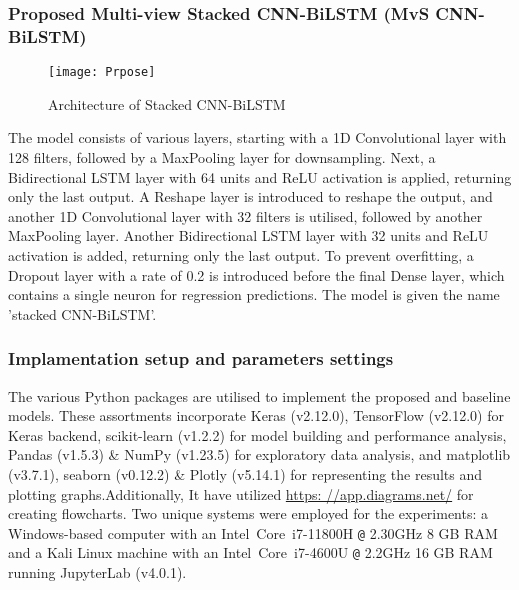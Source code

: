\begin{enumerate}[label=(\alph*)]
\end{enumerate}


\subsubsection{Proposed Multi-view Stacked CNN-BiLSTM (MvS CNN-BiLSTM)}
\begin{figure*}[h!]
	\centering
		\texttt{[image: Prpose]}
	  \caption{Architecture of Stacked CNN-BiLSTM}\label{prosed_cnn-bilstm}
\end{figure*}

The model consists of various layers,  starting with a 1D Convolutional layer with 128 filters,  followed by a MaxPooling layer for downsampling. Next,  a Bidirectional LSTM layer with 64 units and ReLU activation is applied,  returning only the last output. A Reshape layer is introduced to reshape the output, and another 1D Convolutional layer with 32 filters is utilised,  followed by another MaxPooling layer. Another Bidirectional LSTM layer with 32 units and ReLU activation is added, returning only the last output. To prevent overfitting,  a Dropout layer with a rate of 0.2 is introduced before the final Dense layer,  which contains a single neuron for regression predictions. The model is given the name 'stacked CNN-BiLSTM'.

\subsubsection{Implamentation setup and parameters settings}
The various Python packages are utilised to implement the proposed and baseline models. These assortments incorporate Keras (v2.12.0),  TensorFlow (v2.12.0) for Keras backend, scikit-learn (v1.2.2) for model building and performance analysis,  Pandas (v1.5.3) \& NumPy (v1.23.5) for exploratory data analysis,  and matplotlib (v3.7.1),  seaborn (v0.12.2) \& Plotly (v5.14.1) for representing the results and plotting graphs.Additionally,  It have utilized \href{https: //app.diagrams.net/}{https: //app.diagrams.net/} for creating flowcharts. Two unique systems were employed for the experiments:  a Windows-based computer with an Intel\textregistered ~Core\texttrademark ~i7-11800H \texttt{@} 2.30GHz 8 GB RAM and a Kali Linux machine with an Intel\textregistered ~Core\texttrademark ~i7-4600U \texttt{@} 2.2GHz 16 GB RAM running JupyterLab (v4.0.1).


